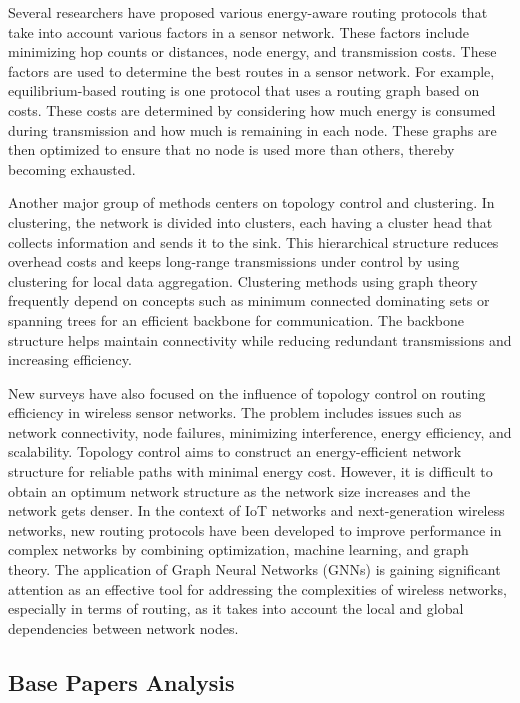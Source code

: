 \documentclass[a4paper,fleqn]{cas-dc}
\numberwithin{equation}{section}
\begin{document}
Several researchers have proposed various energy-aware routing protocols that take into account various factors in a sensor network. These factors include minimizing hop counts or distances, node energy, and transmission costs. These factors are used to determine the best routes in a sensor network. For example, equilibrium-based routing is one protocol that uses a routing graph based on costs. These costs are determined by considering how much energy is consumed during transmission and how much is remaining in each node. These graphs are then optimized to ensure that no node is used more than others, thereby becoming exhausted.

Another major group of methods centers on topology control and clustering. In clustering, the network is divided into clusters, each having a cluster head that collects information and sends it to the sink. This hierarchical structure reduces overhead costs and keeps long-range transmissions under control by using clustering for local data aggregation. Clustering methods using graph theory frequently depend on concepts such as minimum connected dominating sets or spanning trees for an efficient backbone for communication. The backbone structure helps maintain connectivity while reducing redundant transmissions and increasing efficiency.

New surveys have also focused on the influence of topology control on routing efficiency in wireless sensor networks. The problem includes issues such as network connectivity, node failures, minimizing interference, energy efficiency, and scalability. Topology control aims to construct an energy-efficient network structure for reliable paths with minimal energy cost. However, it is difficult to obtain an optimum network structure as the network size increases and the network gets denser. In the context of IoT networks and next-generation wireless networks, new routing protocols have been developed to improve performance in complex networks by combining optimization, machine learning, and graph theory. The application of Graph Neural Networks (GNNs) is gaining significant attention as an effective tool for addressing the complexities of wireless networks, especially in terms of routing, as it takes into account the local and global dependencies between network nodes.

\subsection*{Base Papers Analysis}
\end{document}
